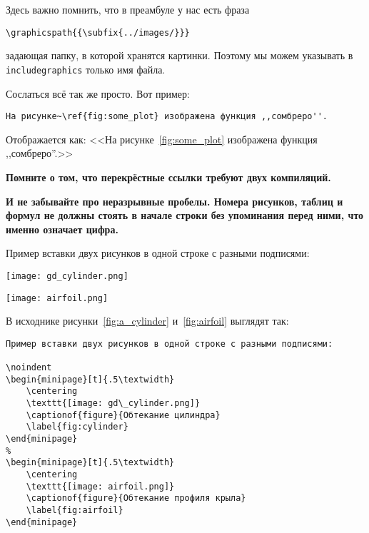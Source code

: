 \documentclass[../homework.tex]{subfiles}
\begin{document}
Здесь важно помнить, что в преамбуле у нас есть фраза
{\small
\begin{verbatim}
\graphicspath{{\subfix{../images/}}}
\end{verbatim}
}
задающая папку, в которой хранятся картинки.
Поэтому мы можем указывать в \texttt{includegraphics} только имя файла.

Сослаться всё так же просто.
Вот пример:
{\small
\begin{verbatim}
На рисунке~\ref{fig:some_plot} изображена функция ,,сомбреро''.
\end{verbatim}
}
Отображается как: <<На рисунке~\ref{fig:some_plot} изображена функция ,,сомбреро''.>>

\textbf{
    Помните о том, что перекрёстные ссылки требуют двух компиляций.
}

\textbf{
    И не забывайте про неразрывные пробелы.
    Номера рисунков, таблиц и формул не должны стоять в начале строки без упоминания перед ними, что именно означает цифра.
}

Пример вставки двух рисунков в одной строке с разными подписями:

\figspace
\noindent
\begin{minipage}[t]{.5\textwidth}
    \centering
    \texttt{[image: gd\_cylinder.png]}
    \label{fig:cylinder}
\end{minipage}
%
\begin{minipage}[t]{.5\textwidth}
    \centering
    \texttt{[image: airfoil.png]}
    \label{fig:airfoil}
\end{minipage}
\figspace

В исходнике рисунки~\ref{fig:a_cylinder} и~\ref{fig:airfoil} выглядят так:

{\small
\begin{verbatim}
Пример вставки двух рисунков в одной строке с разными подписями:

\noindent
\begin{minipage}[t]{.5\textwidth}
    \centering
    \texttt{[image: gd\_cylinder.png]}
    \captionof{figure}{Обтекание цилиндра}
    \label{fig:cylinder}
\end{minipage}
%
\begin{minipage}[t]{.5\textwidth}
    \centering
    \texttt{[image: airfoil.png]}
    \captionof{figure}{Обтекание профиля крыла}
    \label{fig:airfoil}
\end{minipage}
\end{verbatim}
}
\end{document}

